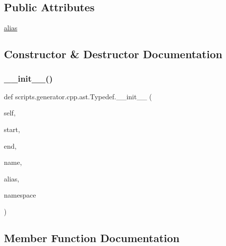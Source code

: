 \subsection*{Public Attributes}
\begin{DoxyCompactItemize}
\item 
\mbox{\hyperlink{classscripts_1_1generator_1_1cpp_1_1ast_1_1_typedef_afbfe7d8c4728de7d8d28ef31dcbcbed3}{alias}}
\end{DoxyCompactItemize}


\subsection{Constructor \& Destructor Documentation}
\mbox{\label{classscripts_1_1generator_1_1cpp_1_1ast_1_1_typedef_a0cfe40364d920440b18d1a6fb50485f1}} 
\subsubsection{\texorpdfstring{\_\_init\_\_()}{\_\_init\_\_()}}
{\footnotesize\ttfamily def scripts.\+generator.\+cpp.\+ast.\+Typedef.\+\_\+\+\_\+init\+\_\+\+\_\+ (\begin{DoxyParamCaption}\item[{}]{self,  }\item[{}]{start,  }\item[{}]{end,  }\item[{}]{name,  }\item[{}]{alias,  }\item[{}]{namespace }\end{DoxyParamCaption})}



\subsection{Member Function Documentation}
\mbox{\label{classscripts_1_1generator_1_1cpp_1_1ast_1_1_typedef_af9fcb3f3950387be184219b6fdd40939}} 
